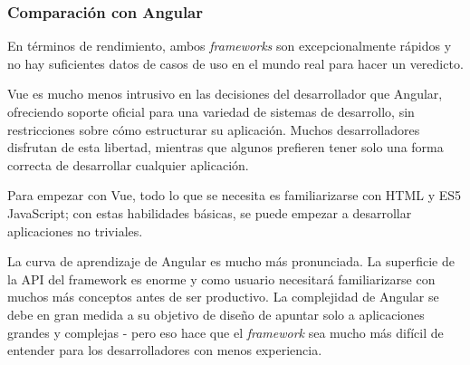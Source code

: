 \subsubsection*{Comparación con Angular}
En términos de rendimiento, ambos \textit{frameworks} son excepcionalmente rápidos y no hay suficientes datos de casos de uso en el mundo real para hacer un veredicto.


Vue es mucho menos intrusivo en las decisiones del desarrollador que Angular, ofreciendo soporte oficial para una variedad de sistemas de desarrollo, sin restricciones sobre cómo estructurar su aplicación. Muchos desarrolladores disfrutan de esta libertad, mientras que algunos prefieren tener solo una forma correcta de desarrollar cualquier aplicación.


Para empezar con Vue, todo lo que se necesita es familiarizarse con HTML y ES5 JavaScript; con estas habilidades básicas, se puede empezar a desarrollar aplicaciones no triviales.


La curva de aprendizaje de Angular es mucho más pronunciada. La superficie de la API del framework es enorme y como usuario necesitará familiarizarse con muchos más conceptos antes de ser productivo. La complejidad de Angular se debe en gran medida a su objetivo de diseño de apuntar solo a aplicaciones grandes y complejas - pero eso hace que el \textit{framework} sea mucho más difícil de entender para los desarrolladores con menos experiencia.